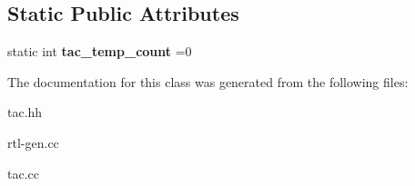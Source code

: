 \subsection*{Static Public Attributes}
\begin{DoxyCompactItemize}
\item 
\mbox{\label{classTemporary__TAC__Opd_af940955a5ec218310094befedc5be565}} 
static int {\bfseries tac\+\_\+temp\+\_\+count} =0
\end{DoxyCompactItemize}


The documentation for this class was generated from the following files\+:\begin{DoxyCompactItemize}
\item 
tac.\+hh\item 
rtl-\/gen.\+cc\item 
tac.\+cc\end{DoxyCompactItemize}
